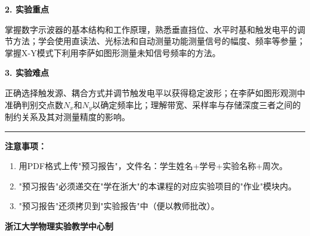 \documentclass[a4paper,12pt]{article}
\begin{document}
\vspace{0.5cm}

{\fontsize{14pt}{20pt}\selectfont \textbf{2. 实验重点}}

\vspace{0.3cm}

{\fontsize{12pt}{18pt}\selectfont

掌握数字示波器的基本结构和工作原理，熟悉垂直挡位、水平时基和触发电平的调节方法；学会使用直读法、光标法和自动测量功能测量信号的幅度、频率等参量；掌握X-Y模式下利用李萨如图形测量未知信号频率的方法。

}

\vspace{0.5cm}

{\fontsize{14pt}{20pt}\selectfont \textbf{3. 实验难点}}

\vspace{0.3cm}

{\fontsize{12pt}{18pt}\selectfont

正确选择触发源、耦合方式并调节触发电平以获得稳定波形；在李萨如图形观测中准确判别交点数$N_x$和$N_y$以确定频率比；理解带宽、采样率与存储深度三者之间的制约关系及其对测量精度的影响。

}

\vfill

\noindent\rule{\textwidth}{0.4pt}

{\fontsize{12pt}{18pt}\selectfont
\textbf{注意事项：}
\begin{enumerate}[label=\arabic*., leftmargin=2em, nosep]
    \item 用PDF格式上传"预习报告"，文件名：学生姓名+学号+实验名称+周次。
    \item "预习报告"必须递交在"学在浙大"的本课程的对应实验项目的"作业"模块内。
    \item "预习报告"还须拷贝到"实验报告"中（便以教师批改）。
\end{enumerate}
}

\vspace{0.5cm}
\begin{center}
    {\fontsize{12pt}{18pt}\selectfont \textbf{浙江大学物理实验教学中心制}}
\end{center}
\end{document}
